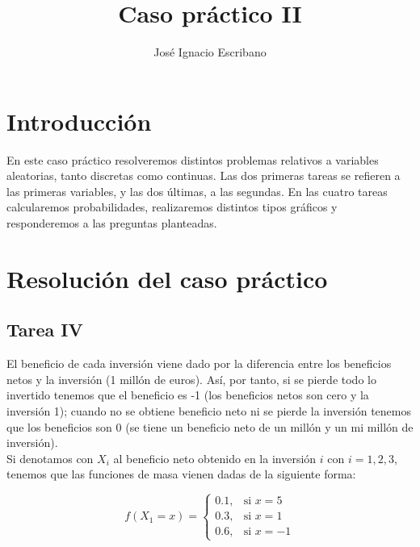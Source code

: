 \documentclass[12pt,a4paper,twoside,openright,titlepage,final]{article}
\author{José Ignacio Escribano}
\title{Caso práctico II}
\begin{document}
\setcounter{page}{1}


\listoffigures
\thispagestyle{empty}
\newpage

\tableofcontents
\thispagestyle{empty}
\newpage


\setcounter{page}{1}

\section{Introducción}

En este caso práctico resolveremos distintos problemas relativos a variables aleatorias, tanto discretas como continuas. Las dos primeras tareas se refieren a las primeras variables, y las dos últimas, a las segundas. En las cuatro tareas calcularemos probabilidades, realizaremos distintos tipos gráficos y responderemos a las preguntas planteadas.

\section{Resolución del caso práctico}



\subsection{Tarea IV}

El beneficio de cada inversión viene dado por la diferencia entre los beneficios netos y la inversión (1 millón de euros). Así, por tanto, si se pierde todo lo invertido tenemos que el beneficio es -1 (los beneficios netos son cero y la inversión 1); cuando no se obtiene beneficio neto ni se pierde la inversión tenemos que los beneficios son 0 (se tiene un beneficio neto de un millón y un mi millón de inversión).\\

Si denotamos con $X_i$ al beneficio neto obtenido en la inversión $i$ con $i = 1,2,3$, tenemos que las funciones de masa vienen dadas de la siguiente forma:

\begin{equation*}
f(X_1 = x) = \begin{cases}
0.1, & \text{si } x = 5 \\
0.3, & \text{si } x = 1 \\
0.6, & \text{si } x = -1
\end{cases}
\end{equation*}
\end{document}

